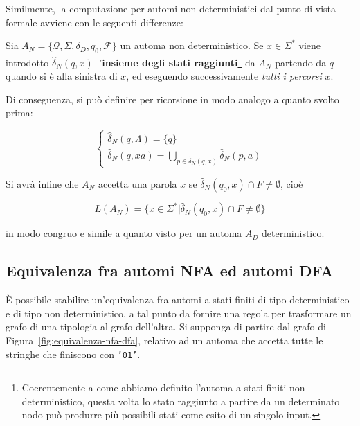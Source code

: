 \documentclass[10pt]{\classname}
\theoremstyle{definition}
\theoremstyle{definition}
\theoremstyle{definition}
\theoremstyle{definition}
\begin{document}
Similmente, la computazione per automi non deterministici dal punto di vista
formale avviene con le seguenti differenze:

Sia $A_N = \{ \mathcal Q, \Sigma, \delta_D, q_0, \mathcal F\}$ un automa non
deterministico. Se $x\in \Sigma^*$ viene introdotto $\hat{\delta}_N (q, x)$
l'\textbf{insieme degli stati raggiunti}\footnote{Coerentemente a come abbiamo
definito l'automa a stati finiti non deterministico, questa volta lo stato
raggiunto a partire da un determinato nodo può produrre più possibili stati
come esito di un singolo input.} da $A_N$ partendo da $q$ quando si è alla
sinistra di $x$, ed eseguendo successivamente \emph{tutti i percorsi} $x$.

Di conseguenza, si può definire per ricorsione in modo analogo a quanto svolto prima:

$$
\left\{
    \begin{array}{l}
        \hat{\delta}_N (q, \Lambda) = \{q\} \\
        \hat{\delta}_N (q, xa) = \displaystyle \bigcup_{p \in \hat{\delta}_N(q, x)} \hat{\delta}_N (p, a)
    \end{array}
\right.
$$

Si avrà infine che $A_N$ accetta una parola $x$ se $\hat{\delta}_N(q_0, x) \cap F
\neq \emptyset$, cioè

$$L(A_N) = \{x \in \Sigma^* | \hat{\delta}_N(q_0, x) \cap F \neq \emptyset \}$$

in modo congruo e simile a quanto visto per un automa $A_D$ deterministico.

\subsection{Equivalenza fra automi NFA ed automi DFA}

È possibile stabilire un'equivalenza fra automi a stati finiti di tipo
deterministico e di tipo non deterministico, a tal punto da fornire una regola
per trasformare un grafo di una tipologia al grafo dell'altra. Si supponga di
partire dal grafo di Figura~\ref{fig:equivalenza-nfa-dfa}, relativo ad un
automa che accetta tutte le stringhe che finiscono con \texttt{'01'}.
\end{document}
